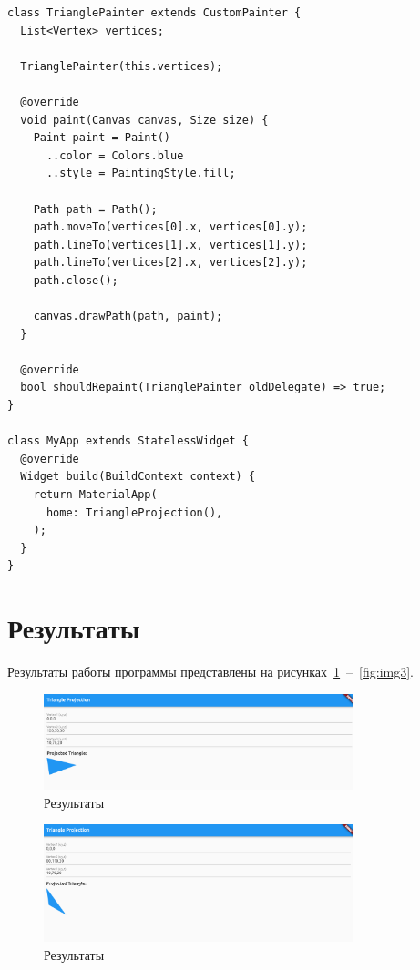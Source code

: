 \documentclass[a4paper, 14pt]{extarticle}
\begin{document}
\begin{lstlisting}[language={},caption={Мобильное приложение выполняющее построение простейших геометрических фигур},label={lst:code1}]
class TrianglePainter extends CustomPainter {
  List<Vertex> vertices;

  TrianglePainter(this.vertices);

  @override
  void paint(Canvas canvas, Size size) {
    Paint paint = Paint()
      ..color = Colors.blue
      ..style = PaintingStyle.fill;

    Path path = Path();
    path.moveTo(vertices[0].x, vertices[0].y);
    path.lineTo(vertices[1].x, vertices[1].y);
    path.lineTo(vertices[2].x, vertices[2].y);
    path.close();

    canvas.drawPath(path, paint);
  }

  @override
  bool shouldRepaint(TrianglePainter oldDelegate) => true;
}

class MyApp extends StatelessWidget {
  @override
  Widget build(BuildContext context) {
    return MaterialApp(
      home: TriangleProjection(),
    );
  }
}
\end{lstlisting}

\section{Результаты}\label{Sect::res}

Результаты работы программы представлены на рисунках~\ref{fig:img1}~--~\ref{fig:img3}.

\begin{figure}[!htb]
	\centering
	\includegraphics[width=0.8\textwidth]{img1}
\caption{Результаты}
\label{fig:img1}
\end{figure}

\begin{figure}[!htb]
	\centering
	\includegraphics[width=0.8\textwidth]{img2}
\caption{Результаты}
\label{fig:img2}
\end{figure}
\end{document}
